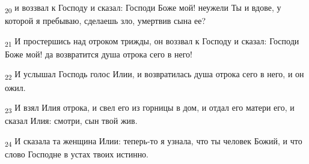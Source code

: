 \begin{tcolorbox}
\textsubscript{20} и воззвал к Господу и сказал: Господи Боже мой! неужели Ты и вдове, у которой я пребываю, сделаешь зло, умертвив сына ее?
\end{tcolorbox}
\begin{tcolorbox}
\textsubscript{21} И простершись над отроком трижды, он воззвал к Господу и сказал: Господи Боже мой! да возвратится душа отрока сего в него!
\end{tcolorbox}
\begin{tcolorbox}
\textsubscript{22} И услышал Господь голос Илии, и возвратилась душа отрока сего в него, и он ожил.
\end{tcolorbox}
\begin{tcolorbox}
\textsubscript{23} И взял Илия отрока, и свел его из горницы в дом, и отдал его матери его, и сказал Илия: смотри, сын твой жив.
\end{tcolorbox}
\begin{tcolorbox}
\textsubscript{24} И сказала та женщина Илии: теперь-то я узнала, что ты человек Божий, и что слово Господне в устах твоих истинно.
\end{tcolorbox}
